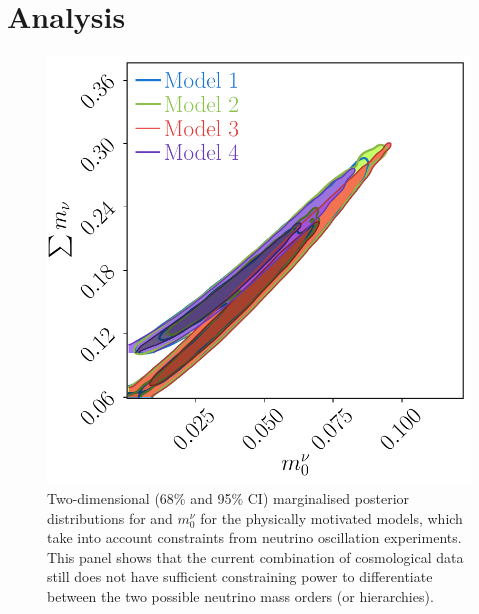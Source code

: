 \section{Analysis}
\begin{figure}
\begin{center}
\includegraphics[scale=0.65]{Neutrino-FIGS/neutrino_hierarc_alt.pdf}
\caption[Two-dimensional (68\% and 95\% CI) marginalised posterior distributions for \NM{} and $m_0^{\nu}$ for the physically motivated models.]{Two-dimensional (68\% and 95\% CI) marginalised posterior distributions for \NM{} and $m_0^{\nu}$ for the physically motivated models, which take into account constraints from neutrino oscillation experiments. This panel shows that the current combination of cosmological data still does not have sufficient constraining power to differentiate between the two possible neutrino mass orders (or hierarchies).}
\label{fig:SumM0}
\end{center}
\end{figure}

